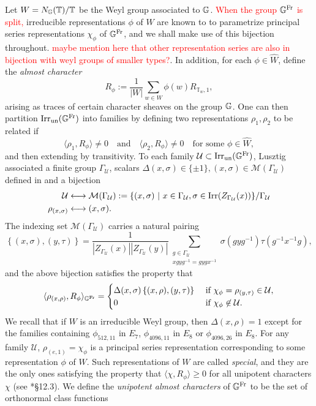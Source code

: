 Let $W=N_{\mathbb{G}}(\mathbb{T})/\mathbb{T}$ be the Weyl group associated to $\mathbb{G}$. \textcolor{red}{When the group $\mathbb{G}^{\mathrm{Fr}}$ is split,} irreducible representations $\phi$ of $W$ are known to to parametrize principal series representations $\chi_\phi$ of $\mathbb{G}^{\mathrm{Fr}}$, and we shall make use of this bijection throughout. \textcolor{red}{maybe mention here that other representation series are also in bijection with weyl groups of smaller types?}. In addition, for each $\phi\in\widehat{W}$, define the \textit{almost character} 
$$R_\phi:=\frac{1}{|W|}\sum_{w\in W}\phi(w)R_{\mathbb{T}_w,1},$$
arising as traces of certain character sheaves on the group $\mathbb{G}$.
One can then partition $\mathrm{Irr}_{\mathrm{un}}(\mathbb{G}^{\mathrm{Fr}})$ into families by defining two representations $\rho_1,\rho_2$ to be related if 
$$\langle\rho_1,R_\phi\rangle\neq0\quad\text{and}\quad\langle\rho_2,R_\phi\rangle\neq0\quad\text{for some }\phi\in\widehat{W},$$
and then extending by transitivity. To each family $\mathcal{U}\subset\mathrm{Irr}_{\mathrm{un}}(\mathbb{G}^{\mathrm{Fr}})$, Lusztig associated a finite group $\Gamma_\mathcal{U}$, scalars $\Delta(x,\sigma)\in\{\pm1\}, (x,\sigma)\in\mathcal{M}(\Gamma_\mathcal{U})$ defined in \cite{Lusztig1984} and a bijection
\begin{align*}
    \mathcal{U}&\longleftrightarrow\mathcal{M}(\Gamma_\mathcal{U}):=\{(x,\sigma)\ |\ x\in\Gamma_\mathcal{U},\sigma\in\Irr(Z_{\Gamma_{\mathcal{U}}}(x))\}/\Gamma_\mathcal{U}\\
    \rho_{(x,\sigma)}&\longleftrightarrow(x,\sigma).
\end{align*}
The indexing set $\mathcal{M}(\Gamma_\mathcal{U})$ carries a natural pairing 
$$\left\{(x,\sigma),(y,\tau)\right\}=\frac{1}{|Z_{\Gamma_\mathcal{U}}(x)||Z_{\Gamma_\mathcal{U}}(y)|}\sum_{\substack{g\in\Gamma_{\mathcal{U}}\\xgyg^{-1}=gygx^{-1}}}\sigma(gyg^{-1})\tau(g^{-1}x^{-1}g),$$
and the above bijection satisfies the property that 
\begin{equation}\label{eqn:inner_product}
    \langle\rho_{(x,\rho)},R_\phi\rangle_{\mathbb{G}^{\mathrm{Fr}}}=\begin{cases}
        \Delta(x,\sigma)\left\{(x,\rho),(y,\tau)\right\}&\text{ if }\chi_\phi=\rho_{(y,\tau)}\in\mathcal{U},\\
        0 & \text{ if }\chi_\phi\not\in\mathcal{U}.
    \end{cases}
\end{equation}
We recall that if $W$ is an irreducible Weyl group, then $\Delta(x,\rho)=1$ except for the families containing $\phi_{512,11}$ in $E_7$, $\phi_{4096,11}$ in $E_8$ or $\phi_{4096,26}$ in $E_8$. For any family $\mathcal{U}$, $\rho_{(e,1)}=\chi_\phi$ is a principal series representation corresponding to some representation $\phi$ of $W$. Such representations of $W$ are called \textit{special}, and they are the only ones satisfying the property that $\langle\chi,R_\phi\rangle\geq0$ for all unipotent characters $\chi$ (see \cite{Carter1985}*{\S12.3}). We define the \textit{unipotent almost characters} of $\mathbb{G}^{\mathrm{Fr}}$ to be the set of orthonormal class functions
